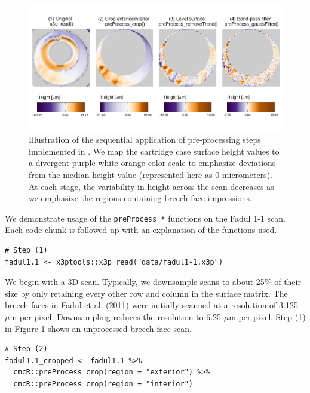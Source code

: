 \begin{figure}[htbp]

{\centering \includegraphics[width=\textwidth]{figures/preProcessPipeline} 

}

\caption{Illustration of the sequential application of pre-processing steps implemented in . We map the cartridge case surface height values to a divergent purple-white-orange color scale to emphasize deviations from the median height value (represented here as 0 micrometers). At each stage, the variability in height across the scan decreases as we emphasize the regions containing breech face impressions.}\label{fig:processingPipeline}
\end{figure}

We demonstrate usage of the \texttt{preProcess\_*} functions on the Fadul 1-1 scan.
Each code chunk is followed up with an explanation of the functions used.

\begin{verbatim}
# Step (1)
fadul1.1 <- x3ptools::x3p_read("data/fadul1-1.x3p")
\end{verbatim}

We begin with a 3D scan.
Typically, we downsample scans to about 25\% of their size by only retaining every other row and column in the surface matrix.
The breech faces in Fadul et al. (2011) were initially scanned at a resolution of 3.125 \(\mu\)m per pixel.
Downsampling reduces the resolution to 6.25 \(\mu\)m per pixel.
Step (1) in Figure \ref{fig:processingPipeline} shows an unprocessed breech face scan.

\begin{verbatim}
# Step (2)
fadul1.1_cropped <- fadul1.1 %>%
  cmcR::preProcess_crop(region = "exterior") %>%
  cmcR::preProcess_crop(region = "interior")
\end{verbatim}

